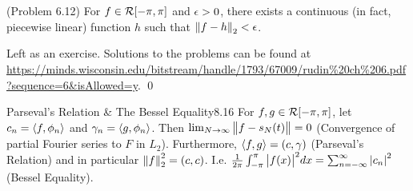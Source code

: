 \begin{ntheorem}{ (Problem 6.12)}{}
    For $f \in \mathcal{R}[-\pi, \pi]$ and $\epsilon > 0$, there exists a continuous (in fact, piecewise linear) function $h$ such that $\norm{f - h}_2 < \epsilon$.
\end{ntheorem}

\begin{nproof}
    Left as an exercise. Solutions to the problems can be found at \url{https://minds.wisconsin.edu/bitstream/handle/1793/67009/rudin%20ch%206.pdf?sequence=6&isAllowed=y}. \qed
\end{nproof}

\begin{theorem}{Parseval's Relation \& The Bessel Equality}{8.16}
    For $f, g \in \mathcal{R}[-\pi, \pi]$, let $c_n = \left< f, \phi_n \right>$ and $\gamma_n = \left< g, \phi_n \right>$. Then $\lim_{N \rightarrow \infty}\norm{f - s_N(t)} = 0$ (Convergence of partial Fourier series to $F$ in $L_2$). Furthermore, $\left< f, g \right> = (c, \gamma)$ (Parseval's Relation) and in particular $\norm{f}_2^2 = (c, c)$. I.e. $\frac{1}{2\pi}\int_{-\pi}^\pi \abs{f(x)}^2dx = \sum_{n=-\infty}^\infty \abs{c_n}^2$ (Bessel Equality).
\end{theorem}

